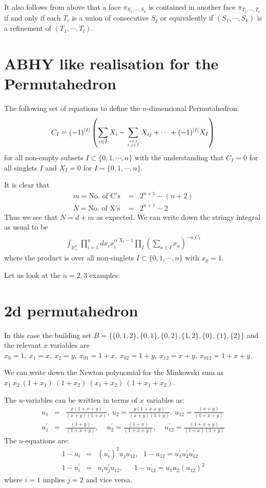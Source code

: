 \documentclass[hidelinks,12pt]{article}
\newcommand{\bea}[1]{\begin{eqnarray}\label{#1} }
\newcommand{\eea}{\end{eqnarray}}
\def\bea{\begin{eqnarray}}
\def\eea{\end{eqnarray}}
\begin{document}
It also follows from above that a face $\pi_{S_1,\cdots,S_k}$ is contained in another face $\pi_{T_1,\cdots,T_l}$ if and only if each $T_i$ is a union of consecutive $S_j$ or equivalently if $(S_1,\cdots,S_k)$ is a refinement of $(T_1,\cdots,T_l)$.

\section*{ABHY like realisation for the Permutahedron}
The following set of equations to define the $n$-dimensional Permutahedron: 
\bea
C_I = (-1)^{|I|} \left( \sum_{i \in I} X_i - \sum _{{i<j}\atop{i,j \in I}} X_{ij} +\cdots + (-1)^{|I|}  X_I \right) \nonumber
\eea
for all non-empty subsets $I \subset \{0,1,\cdots,n\}$ with the understanding that $C_{I} =0$ for all singlets $I$ and $X_{I} =0$ for $I=\{ 0,1,\cdots,n \}$. 

It is clear that
\bea
m= \text{No. of  C's }&=& 2^{n+1}-(n+2) \nonumber \\
N= \text{No. of X's} &=& 2^{n+1}- 2 \nonumber 
\eea
Thus we see that $N= d+m$ as expected. We can write down the stringy integral as usual to be 
\bea
\int_{\mathbb{R}^{n}_{+}} \prod_{i =1}^{n} d x_i x_i^{\alpha^{'} X_i -1} \prod_{I} \left (\sum_{a\in I} x_a \right) ^{-\alpha^{'} C_I} \nonumber
\eea 
where the product is over all non-singlets $ I \subset \{0,1,\cdots,n\}$ with $x_{0} =1$.

Let us look at the $n=2,3$ examples:

\section*{2d permutahedron}
In this case the building set $B=\{ \{ 0,1,2\},\{ 0,1\},\{0,2\},\{1,2\},\{0\},\{1\},\{2\}\}$ and the relevant $x$ variables are $x_0=1, ~x_1=x, ~x_2=y, ~x_{01}=1+x, ~x_{02}=1+y,~ x_{12}=x+y,~ x_{012}=1+x+y$. 

We can write down the Newton polynomial for the Minkowski sum as $ x_1~ x_2~(1+x_1)~(1+x_2)~(x_1+x_2)~(1+x_1+x_2)$.

The $u$-variables can be written in terms of $x$ variables as:
\bea
u_1&=&\frac{x(1+x+y)}{(x+y)(1+x)}, ~ u_2 =\frac{y(1+x+y)}{(x+y)(1+y)},~ u_{12}=\frac{(x+y)}{(1+x+y)}\nonumber \\
u^{'}_1&=&\frac{(1+y)}{(1+x+y)}, ~~~~~ u^{'}_2=\frac{(1+x)}{(1+x+y)},~~~~~ u^{'}_{12}= \frac{(1+x+y)}{(1+x)(1+y)} \nonumber
\eea
The $u$-equations are:
\bea
1-u_i &=& (u^{'}_i)^2 u_j u^{'}_{12}, ~~~ 1-u_{12} = u^{'}_{1} u^{'}_{2} u^{'}_{12} \nonumber \\
1-u^{'}_i &=& u_i u^{'}_j u_{12}, ~~~~~~~ 1-u^{'}_{12} = u_{1} u_{2} (u_{12})^2 \nonumber
\eea
where $i=1$ implies $j=2$ and vice versa.
\end{document}
